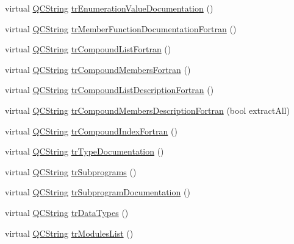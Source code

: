 \begin{DoxyCompactItemize}
virtual \mbox{\hyperlink{class_q_c_string}{Q\+C\+String}} \mbox{\hyperlink{class_translator_korean_af6d9e6bc52deeeca5ead7f9083f8099b}{tr\+Enumeration\+Value\+Documentation}} ()
\item 
virtual \mbox{\hyperlink{class_q_c_string}{Q\+C\+String}} \mbox{\hyperlink{class_translator_korean_af7a255882ab03e122e2dd6d5b1f7223b}{tr\+Member\+Function\+Documentation\+Fortran}} ()
\item 
virtual \mbox{\hyperlink{class_q_c_string}{Q\+C\+String}} \mbox{\hyperlink{class_translator_korean_aaadeec829930d258a7064f6a90545d4f}{tr\+Compound\+List\+Fortran}} ()
\item 
virtual \mbox{\hyperlink{class_q_c_string}{Q\+C\+String}} \mbox{\hyperlink{class_translator_korean_a3fc6d38e3bb16bef81009a67a76300ab}{tr\+Compound\+Members\+Fortran}} ()
\item 
virtual \mbox{\hyperlink{class_q_c_string}{Q\+C\+String}} \mbox{\hyperlink{class_translator_korean_aa5ac6f40895c988e82a039f24d0d7af2}{tr\+Compound\+List\+Description\+Fortran}} ()
\item 
virtual \mbox{\hyperlink{class_q_c_string}{Q\+C\+String}} \mbox{\hyperlink{class_translator_korean_aae94b4f8eff979fee43e96c596395bcb}{tr\+Compound\+Members\+Description\+Fortran}} (bool extract\+All)
\item 
virtual \mbox{\hyperlink{class_q_c_string}{Q\+C\+String}} \mbox{\hyperlink{class_translator_korean_a8147d72a8b9d61b0bb0518cb7388e307}{tr\+Compound\+Index\+Fortran}} ()
\item 
virtual \mbox{\hyperlink{class_q_c_string}{Q\+C\+String}} \mbox{\hyperlink{class_translator_korean_aa90ae72e2809467cd71af1875b2d2d6a}{tr\+Type\+Documentation}} ()
\item 
virtual \mbox{\hyperlink{class_q_c_string}{Q\+C\+String}} \mbox{\hyperlink{class_translator_korean_a1c8be8fe694bfd04194706b9c41e04ac}{tr\+Subprograms}} ()
\item 
virtual \mbox{\hyperlink{class_q_c_string}{Q\+C\+String}} \mbox{\hyperlink{class_translator_korean_a906183f849589c0a52239fb9714b8421}{tr\+Subprogram\+Documentation}} ()
\item 
virtual \mbox{\hyperlink{class_q_c_string}{Q\+C\+String}} \mbox{\hyperlink{class_translator_korean_ad7520d47e583017a1bcbdce8e2864bb0}{tr\+Data\+Types}} ()
\item 
virtual \mbox{\hyperlink{class_q_c_string}{Q\+C\+String}} \mbox{\hyperlink{class_translator_korean_af469ef927e0c319daced69693d93f5f4}{tr\+Modules\+List}} ()
\item 

\end{DoxyCompactItemize}
